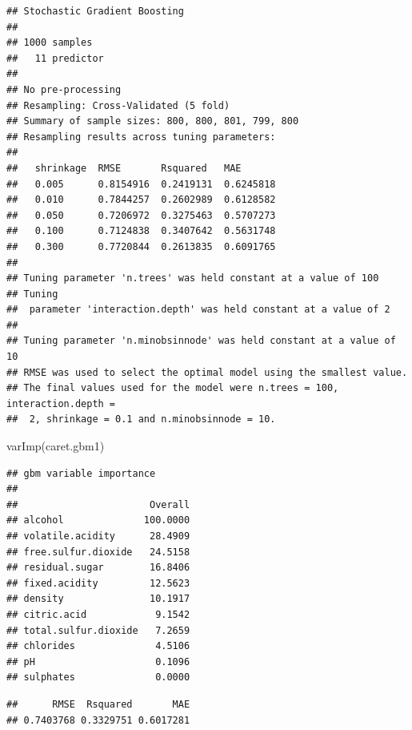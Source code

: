 \documentclass[
]{book}
\newenvironment{Shaded}{\begin{snugshade}}{\end{snugshade}}
\newcommand{\AttributeTok}[1]{\textcolor[rgb]{0.77,0.63,0.00}{#1}}
\newcommand{\FunctionTok}[1]{\textcolor[rgb]{0.00,0.00,0.00}{#1}}
\newcommand{\NormalTok}[1]{#1}
\newcommand{\SpecialCharTok}[1]{\textcolor[rgb]{0.00,0.00,0.00}{#1}}
\theoremstyle{break}
\theoremstyle{definition}
\theoremstyle{definition}
\theoremstyle{definition}
\theoremstyle{definition}
\theoremstyle{remark}
\begin{document}
\begin{verbatim}
## Stochastic Gradient Boosting 
## 
## 1000 samples
##   11 predictor
## 
## No pre-processing
## Resampling: Cross-Validated (5 fold) 
## Summary of sample sizes: 800, 800, 801, 799, 800 
## Resampling results across tuning parameters:
## 
##   shrinkage  RMSE       Rsquared   MAE      
##   0.005      0.8154916  0.2419131  0.6245818
##   0.010      0.7844257  0.2602989  0.6128582
##   0.050      0.7206972  0.3275463  0.5707273
##   0.100      0.7124838  0.3407642  0.5631748
##   0.300      0.7720844  0.2613835  0.6091765
## 
## Tuning parameter 'n.trees' was held constant at a value of 100
## Tuning
##  parameter 'interaction.depth' was held constant at a value of 2
## 
## Tuning parameter 'n.minobsinnode' was held constant at a value of 10
## RMSE was used to select the optimal model using the smallest value.
## The final values used for the model were n.trees = 100, interaction.depth =
##  2, shrinkage = 0.1 and n.minobsinnode = 10.
\end{verbatim}

\begin{Shaded}
\begin{Highlighting}[]
\FunctionTok{varImp}\NormalTok{(caret.gbm1)}
\end{Highlighting}
\end{Shaded}

\begin{verbatim}
## gbm variable importance
## 
##                       Overall
## alcohol              100.0000
## volatile.acidity      28.4909
## free.sulfur.dioxide   24.5158
## residual.sugar        16.8406
## fixed.acidity         12.5623
## density               10.1917
## citric.acid            9.1542
## total.sulfur.dioxide   7.2659
## chlorides              4.5106
## pH                     0.1096
## sulphates              0.0000
\end{verbatim}

\begin{Shaded}
\end{Shaded}

\begin{verbatim}
##      RMSE  Rsquared       MAE 
## 0.7403768 0.3329751 0.6017281
\end{verbatim}
\end{document}
